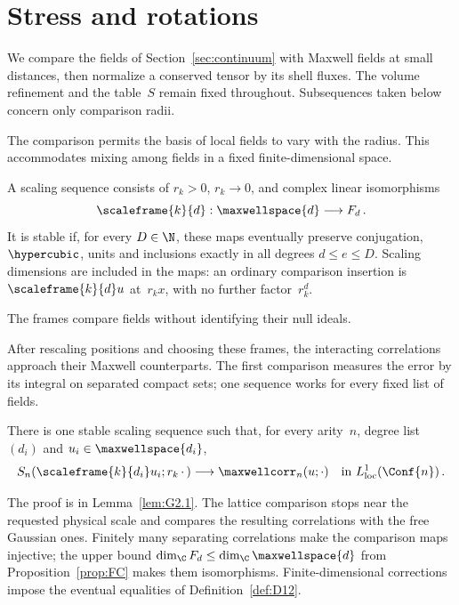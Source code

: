 \section{Stress and rotations}\label{sec:stress}

We compare the fields of Section~\ref{sec:continuum} with Maxwell fields at small distances, then normalize a conserved tensor by its shell fluxes. The volume refinement and the table~$S$ remain fixed throughout. Subsequences taken below concern only comparison radii.

The comparison permits the basis of local fields to vary with the radius. This accommodates mixing among fields in a fixed finite-dimensional space.
\begin{definition}\label{def:D12}
A scaling sequence consists of $r_k>0$, $r_k\to0$, and complex linear isomorphisms
\begin{equation*}
\scaleframe{k}{d}:\maxwellspace{d}\longrightarrow F_d\,.
\end{equation*}
It is stable if, for every $D\in\N$, these maps eventually preserve conjugation, $\hypercubic$, units and inclusions exactly in all degrees $d\le e\le D$. Scaling dimensions are included in the maps: an ordinary comparison insertion is $\scaleframe{k}{d}u$ at~$r_kx$, with no further factor~$r_k^d$.
\end{definition}
The frames compare fields without identifying their null ideals.

After rescaling positions and choosing these frames, the interacting correlations approach their Maxwell counterparts. The first comparison measures the error by its integral on separated compact sets; one sequence works for every fixed list of fields.
\begin{proposition}\label{prop:MC}
There is one stable scaling sequence such that, for every arity~$n$, degree list $(d_i)$ and $u_i\in\maxwellspace{d_i}$,
\begin{equation*}
S_n(\scaleframe{k}{d_i}u_i;r_k\,\cdot\,)\longrightarrow\maxwellcorr_n(u;\cdot)
\quad\text{in }L^1_{\rm loc}(\Conf{n})\,.
\end{equation*}
\end{proposition}
The proof is in Lemma~\ref{lem:G2.1}. The lattice comparison stops near the requested physical scale and compares the resulting correlations with the free Gaussian ones. Finitely many separating correlations make the comparison maps injective; the upper bound $\dim_\C F_d\le\dim_\C\maxwellspace{d}$ from Proposition~\ref{prop:FC} makes them isomorphisms. Finite-dimensional corrections impose the eventual equalities of Definition~\ref{def:D12}.

